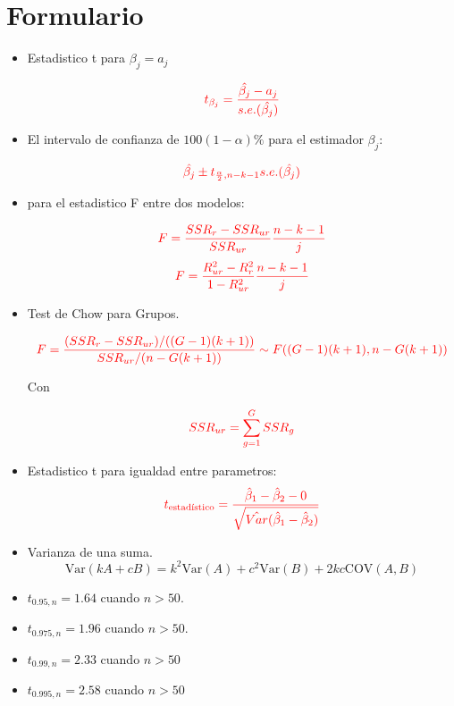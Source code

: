 \documentclass[10pt,a4paper]{article}
\begin{document}
\newpage
\section*{Formulario}
\begin{itemize}

\item Estadistico t para $\beta_j = a_j$

$$\color{red}{t_{\beta_j}=\frac{\hat{\beta_j}-a_j}{s.e.(\hat{\beta_j})}}$$

\item El intervalo de confianza de $100(1-\alpha)\%$ para el estimador $\beta_j$:

$${\color{red}\hat{\beta_j} \pm t_{\frac{\alpha}{2},n-k-1}s.e.(\hat{\beta_j})}$$


\item para el estadistico F entre dos modelos:

$$\color{red}{F=\frac{SSR_r-SSR_{ur}}{SSR_{ur}}\frac{n-k-1}{j}}$$
$$\color{red}{F=\frac{R^2_{ur}-R^2_{r}}{1-R^2_{ur}}\frac{n-k-1}{j}}$$

\item Test de Chow para Grupos.

    \[\color{red}
    F = \frac{(SSR_r - SSR_{ur}) / ((G - 1)(k + 1))}{SSR_{ur} / (n - G(k + 1))} \sim F((G - 1)(k + 1), n - G(k + 1))
    \]

Con

$$\color{red}SSR_{ur} = \sum_{g=1}^G SSR_g$$

\item Estadistico t para igualdad entre parametros:
 \[\color{red}t_{\text{estadístico}} = \frac{\hat{\beta}_1 - \hat{\beta}_2 - 0}{\sqrt{\hat{Var}(\hat{\beta}_1 - \hat{\beta}_2)}}\]


\item  Varianza de una suma.
{\color{red}
$$\text{Var}(kA + cB) = k^2\text{Var}(A) + c^2\text{Var}(B) + 2kc\text{COV}(A, B)$$}

\item $t_{0.95,n} = 1.64$ cuando $n >50$.
\item $t_{0.975,n} = 1.96$ cuando $n >50$.
\item $t_{0.99,n}=2.33$ cuando $n>50$
\item $t_{0.995,n}=2.58$ cuando $n>50$



\end{itemize}
\end{document}
